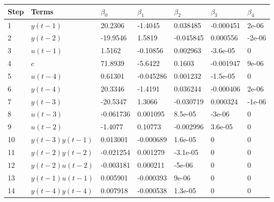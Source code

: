 \begin{tabular}{lllllll}
Step & Terms & $\beta_{0}$ & $\beta_{1}$ & $\beta_{2}$ & $\beta_{3}$ & $\beta_{4}$ \\ 
\hline 
1 & $y(t-1)$ & 20.2306 & -1.4045 & 0.038485 & -0.000451 & 2e-06 \\ 
2 & $y(t-2)$ & -19.9546 & 1.5819 & -0.045845 & 0.000556 & -2e-06 \\ 
3 & $u(t-1)$ & 1.5162 & -0.10856 & 0.002963 & -3.6e-05 & 0 \\ 
4 & $c$ & 71.8939 & -5.6422 & 0.1603 & -0.001947 & 9e-06 \\ 
5 & $u(t-4)$ & 0.61301 & -0.045286 & 0.001232 & -1.5e-05 & 0 \\ 
6 & $y(t-4)$ & 20.3346 & -1.4191 & 0.036244 & -0.000406 & 2e-06 \\ 
7 & $y(t-3)$ & -20.5347 & 1.3066 & -0.030719 & 0.000324 & -1e-06 \\ 
8 & $u(t-3)$ & -0.061736 & 0.001095 & 8.5e-05 & -3e-06 & 0 \\ 
9 & $u(t-2)$ & -1.4077 & 0.10773 & -0.002996 & 3.6e-05 & 0 \\ 
10 & $y(t-3)y(t-1)$ & 0.013001 & -0.000689 & 1.6e-05 & 0 & 0 \\ 
11 & $y(t-2)y(t-2)$ & -0.021254 & 0.001279 & -3.1e-05 & 0 & 0 \\ 
12 & $y(t-2)u(t-2)$ & -0.003181 & 0.000211 & -5e-06 & 0 & 0 \\ 
13 & $y(t-1)u(t-1)$ & 0.005901 & -0.000393 & 9e-06 & 0 & 0 \\ 
14 & $y(t-4)y(t-4)$ & 0.007918 & -0.000538 & 1.3e-05 & 0 & 0 \\ 
\hline 
\end{tabular}